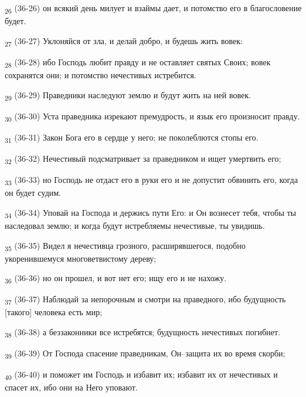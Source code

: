 \begin{tcolorbox}
\textsubscript{26} (36-26) он всякий день милует и взаймы дает, и потомство его в благословение будет.
\end{tcolorbox}
\begin{tcolorbox}
\textsubscript{27} (36-27) Уклоняйся от зла, и делай добро, и будешь жить вовек:
\end{tcolorbox}
\begin{tcolorbox}
\textsubscript{28} (36-28) ибо Господь любит правду и не оставляет святых Своих; вовек сохранятся они; и потомство нечестивых истребится.
\end{tcolorbox}
\begin{tcolorbox}
\textsubscript{29} (36-29) Праведники наследуют землю и будут жить на ней вовек.
\end{tcolorbox}
\begin{tcolorbox}
\textsubscript{30} (36-30) Уста праведника изрекают премудрость, и язык его произносит правду.
\end{tcolorbox}
\begin{tcolorbox}
\textsubscript{31} (36-31) Закон Бога его в сердце у него; не поколеблются стопы его.
\end{tcolorbox}
\begin{tcolorbox}
\textsubscript{32} (36-32) Нечестивый подсматривает за праведником и ищет умертвить его;
\end{tcolorbox}
\begin{tcolorbox}
\textsubscript{33} (36-33) но Господь не отдаст его в руки его и не допустит обвинить его, когда он будет судим.
\end{tcolorbox}
\begin{tcolorbox}
\textsubscript{34} (36-34) Уповай на Господа и держись пути Его: и Он вознесет тебя, чтобы ты наследовал землю; и когда будут истребляемы нечестивые, ты увидишь.
\end{tcolorbox}
\begin{tcolorbox}
\textsubscript{35} (36-35) Видел я нечестивца грозного, расширявшегося, подобно укоренившемуся многоветвистому дереву;
\end{tcolorbox}
\begin{tcolorbox}
\textsubscript{36} (36-36) но он прошел, и вот нет его; ищу его и не нахожу.
\end{tcolorbox}
\begin{tcolorbox}
\textsubscript{37} (36-37) Наблюдай за непорочным и смотри на праведного, ибо будущность [такого] человека есть мир;
\end{tcolorbox}
\begin{tcolorbox}
\textsubscript{38} (36-38) а беззаконники все истребятся; будущность нечестивых погибнет.
\end{tcolorbox}
\begin{tcolorbox}
\textsubscript{39} (36-39) От Господа спасение праведникам, Он--защита их во время скорби;
\end{tcolorbox}
\begin{tcolorbox}
\textsubscript{40} (36-40) и поможет им Господь и избавит их; избавит их от нечестивых и спасет их, ибо они на Него уповают.
\end{tcolorbox}
